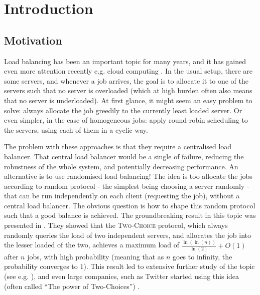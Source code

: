 \chapter{Introduction}\label{introduction}

\ifpdf
    \graphicspath{{Chapter1/Figs/Raster/}{Chapter1/Figs/PDF/}{Chapter1/Figs/}}
\else
    \graphicspath{{Chapter1/Figs/Vector/}{Chapter1/Figs/}}
\fi


\section{Motivation}

Load balancing has been an important topic for many years, and it has gained even more attention recently e.g. cloud computing \cite{mishra2020cloud}. In the usual setup, there are some servers, and whenever a job arrives, the goal is to allocate it to one of the servers such that no server is overloaded (which at high burden often also means that no server is underloaded). At first glance, it might seem an easy problem to solve: always allocate the job greedily to the currently least loaded server. Or even simpler, in the case of homogeneous jobs: apply round-robin scheduling to the servers, using each of them in a cyclic way. 

The problem with these approaches is that they require a centralised load balancer. That central load balancer would be a single of failure, reducing the robustness of the whole system, and potentially decreasing performance. An alternative is to use randomised load balancing! The idea is too allocate the jobs according to random protocol - the simplest being choosing a server randomly - that can be run independently on each client (requesting the job), without a central load balancer. The obvious question is how to shape this random protocol such that a good balance is achieved. The groundbreaking result in this topic was presented in \cite{azar1999twochoice}. They showed that the \textsc{Two-Choice} protocol, which always randomly queries the load of two independent servers, and allocates the job into the lesser loaded of the two, achieves a maximum load of $\frac{\ln(\ln(n))}{\ln(2)} + O(1)$ after $n$ jobs, with high probability (meaning that as $n$ goes to infinity, the probability converges to $1$). This result led to extensive further study of the topic (see e.g. \cite{richa2001surveytwochoice}), and even large companies, such as Twitter started using this idea (often called ``The power of Two-Choices'') \cite{anderson2019twitter}.


